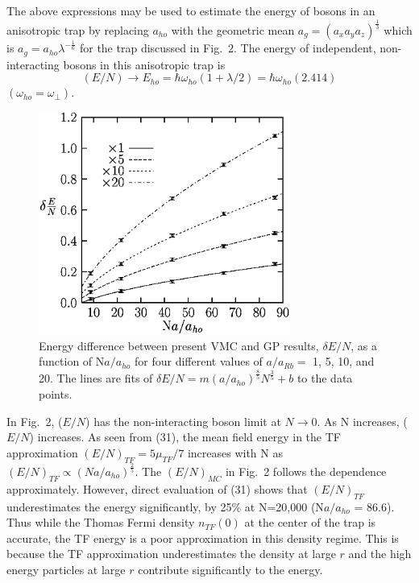 \documentclass[aps,pra,twocolumn,groupedaddress]{revtex4}
\begin{document}
The above expressions may be used to estimate the energy of bosons in an anisotropic trap by
 replacing $a_{ho}$ with the geometric mean $a_g=(a_x a_y a_z)^{\frac{1}{3}}$
which is $a_g = a_{ho}\lambda^{-\frac{1}{6}}$ for the trap discussed in Fig.~2.
The energy of independent, non-interacting bosons in this anisotropic trap
is 
\begin{equation}
(E/N) \rightarrow E_{ho} = \hbar\omega_{ho}(1+\lambda/2) = \hbar\omega_{ho}(2.414)
\end{equation}
$(\omega_{ho} = \omega_{\perp})$.  
   \begin{figure}
\begin{center}
\includegraphics[width=3.25in]{fig10.ps}
\caption{Energy difference between present VMC and GP results,
$\delta{E/N}$, as a function of N$a/a_{ho}$ for four different
values of $a/a_{Rb} =$ 1, 5, 10, and 20.
The lines are fits of $\delta E/N = m(a/a_{ho})^{\frac{8}{5}}N^{\frac{3}{5}}+b$
to the data points.}
\end{center}
    \end{figure} 
In Fig.~2, ($E/N$) has the non-interacting boson limit at $N \rightarrow 0$.
As N increases, ($E/N$) increases.  As seen from (31), the mean field energy 
in the TF approximation $(E/N)_{TF} = 5\mu_{TF}/7$ increases 
with N as $(E/N)_{TF} \propto
(Na/a_{ho})^{\frac{2}{5} }$.  The $(E/N)_{MC}$ in Fig.~2 follows the dependence 
approximately.
However, direct evaluation of (31) shows that $(E/N)_{TF}$ underestimates the
energy significantly, by 25\% at N=20,000 (N$a/a_{ho}$ = 86.6).  Thus while the
Thomas Fermi density $n_{TF}(0)$ at the center of the trap is accurate, the
TF energy is a poor approximation in this density regime.  This is because the TF 
approximation underestimates the density at large $r$ and the high energy particles at 
large $r$ contribute significantly to the energy. 
\end{document}
